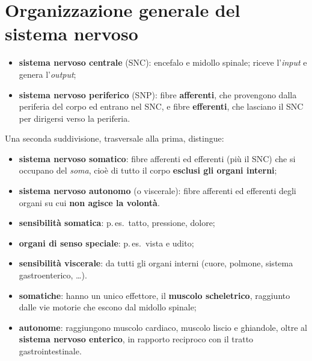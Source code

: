 \section{Organizzazione generale del sistema nervoso}

\begin{itemize}
  \item \textbf{sistema nervoso centrale} (SNC): encefalo e midollo spinale; riceve l'\textit{input}
    e genera l'\textit{output};
  \item \textbf{sistema nervoso periferico} (SNP): fibre \textbf{afferenti}, che provengono dalla
    periferia del corpo ed entrano nel SNC, e fibre \textbf{efferenti}, che lasciano il SNC per
    dirigersi verso la periferia.
\end{itemize}

Una seconda suddivisione, trasversale alla prima, distingue:
\begin{itemize}
  \item \textbf{sistema nervoso somatico}: fibre afferenti ed efferenti (più il SNC) che si
    occupano del \textit{soma}, cioè di tutto il corpo \textbf{esclusi gli organi interni};
  \item \textbf{sistema nervoso autonomo} (o viscerale): fibre afferenti ed efferenti degli organi
    su cui \textbf{non agisce la volontà}.
\end{itemize}

\begin{itemize}
  \item \textbf{sensibilità somatica}: p.\,es.\ tatto, pressione, dolore;
  \item \textbf{organi di senso speciale}: p.\,es.\ vista e udito;
  \item \textbf{sensibilità viscerale}: da tutti gli organi interni (cuore, polmone, sistema
    gastroenterico, \dots).
\end{itemize}

\begin{itemize}
  \item \textbf{somatiche}: hanno un unico effettore, il \textbf{muscolo scheletrico}, raggiunto
    dalle vie motorie che escono dal midollo spinale;
  \item \textbf{autonome}: raggiungono muscolo cardiaco, muscolo liscio e ghiandole, oltre al
    \textbf{sistema nervoso enterico}, in rapporto reciproco con il tratto gastrointestinale.
\end{itemize}

